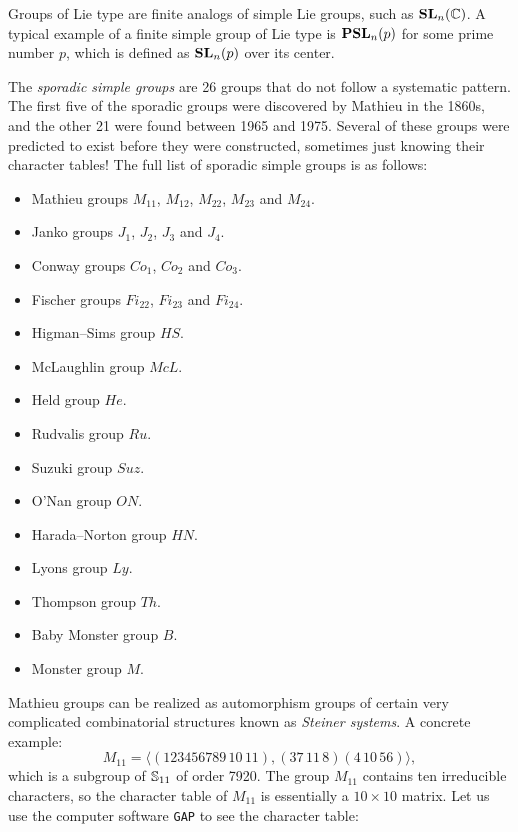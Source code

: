 Groups of Lie type are finite analogs of simple Lie groups, such as 
$\mathbf{SL}_n(\mathbb{C})$. A typical example
of a finite simple group of Lie type is
$\mathbf{PSL}_n(p)$ for some prime number $p$, which is defined
as $\mathbf{SL}_n(p)$ over its center. 

The \emph{sporadic simple groups} are 26 groups that do not follow a systematic pattern. 
The first five of the sporadic groups were discovered by Mathieu in the 1860s, and the other 21 
were found between 1965 and 1975.
Several of these groups were predicted to exist before they were constructed, sometimes
just knowing their character tables! 
The full list of sporadic simple groups is as follows:
\begin{itemize}
\item Mathieu groups $M_{11}$, $M_{12}$, $M_{22}$, $M_{23}$ and $M_{24}$.
\item Janko groups $J_1$, $J_2$, $J_3$ and $J_4$.
\item Conway groups $Co_1$, $Co_2$ and $Co_3$.
\item Fischer groups $Fi_{22}$, $Fi_{23}$ and $Fi_{24}$. 
\item Higman–Sims group $HS$.
\item McLaughlin group $McL$.
\item Held group $He$.
\item Rudvalis group $Ru$.
\item Suzuki group $Suz$.
\item O'Nan group $ON$.
\item Harada–Norton group $HN$.
\item Lyons group $Ly$.
\item Thompson group $Th$.
\item Baby Monster group $B$.
\item Monster group $M$.
\end{itemize}

Mathieu groups can be realized 
as automorphism groups of certain very complicated
combinatorial structures known as \emph{Steiner systems}. 
A concrete example: 
\[
M_{11}=\langle (123456789\,10\,11), (37\,11\,8)(4\,10\,56)\rangle,
\]
which is a subgroup of $\mathbb{S}_{11}$ of order 7920. The group
$M_{11}$ contains ten irreducible characters, so the
character table of $M_{11}$ is essentially a $10\times 10$ matrix. Let us
use the computer software \lstinline{GAP} 
to see the character table:

